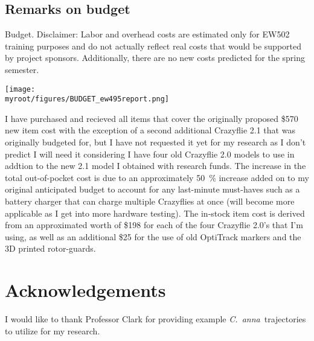 \documentclass[onecolumn,10pt]{IEEEtran}
\newcommand{\myroot}{../}
\newcommand{\Canna}{\emph{C.~anna}}
\begin{document}
\subsection{Remarks on budget}
\begin{table}[hb]
\caption{Budget. Disclaimer: Labor and overhead costs are estimated only for EW502 training purposes and do not actually reflect real costs that would be supported by project sponsors. Additionally, there are no new costs predicted for the spring semester.}
\begin{center}
\texttt{[image: \\myroot/figures/BUDGET\_ew495report.png]}
\end{center}
\label{table-budget}
\end{table}


I have purchased and recieved all items that cover the originally proposed \$570 new item cost with the exception of a second additional Crazyflie 2.1 that was originally budgeted for, but I have not requested it yet for my research as I don't predict I will need it considering I have four old Crazyflie 2.0 models to use in addtion to the new 2.1 model I obtained with research funds. The increase in the total out-of-pocket cost is due to an approximately \SI{50}{\percent} increase added on to my original anticipated budget to account for any last-minute must-haves such as a battery charger that can charge multiple Crazyflies at once (will become more applicable as I get into more hardware testing). The in-stock item cost is derived from an approximated worth of \$198 for each of the four Crazyflie 2.0's that I'm using, as well as an additional \$25 for the use of old OptiTrack markers and the 3D printed rotor-guards.


\section*{Acknowledgements}
I would like to thank Professor Clark for providing example \Canna\ trajectories to utilize for my research. 







\clearpage
\appendix
\end{document}
